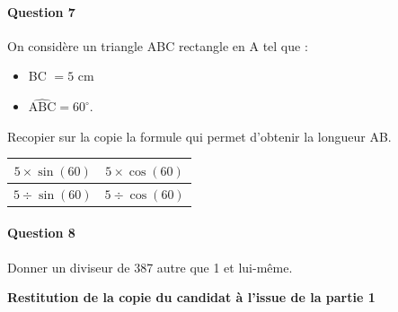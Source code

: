 \documentclass[exercice]{thedocument}%
\begin{document}
    \vspace{8pt}
    \paragraph{Question 7}
    On considère un triangle ABC rectangle en A tel que :
    \begin{itemize}
    \item BC $= 5$ cm
    \item $\widehat{\text{ABC}} = 60^\circ$.
    \end{itemize}
    Recopier sur la copie la formule qui permet d'obtenir la longueur AB.

    \vspace{6pt}
    \begin{minipage}{0.45\textwidth}
    \begin{center}
    \begin{tabular}{|c|c|}
    \hline
    $5 \times \sin(60)$ & $5 \times \cos(60)$ \\
    \hline
    $5 \div \sin(60)$ & $5 \div \cos(60)$ \\
    \hline
    \end{tabular}
    \end{center}
    \end{minipage}
    \hfill
    \begin{minipage}{0.50\textwidth}
    \begin{center}
    \vspace{4pt}

    \end{center}
    \end{minipage}

    \vspace{10pt}
    \paragraph{Question 8}
    Donner un diviseur de 387 autre que 1 et lui-même.

    \vspace{20pt}
    \begin{center}
    \textbf{Restitution de la copie du candidat à l'issue de la partie 1}
    \end{center}
\end{document}
